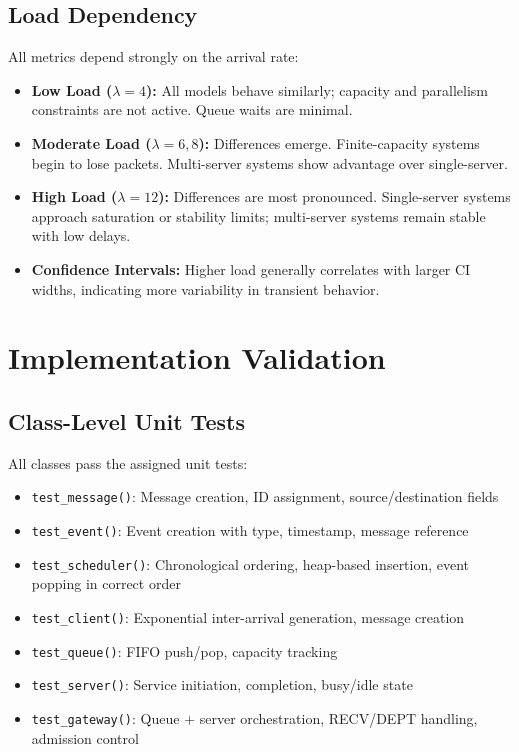 \documentclass[12pt]{article}
\begin{document}
\subsection{Load Dependency}

All metrics depend strongly on the arrival rate:

\begin{itemize}
    \item \textbf{Low Load ($\lambda = 4$):} All models behave similarly; capacity and parallelism constraints are not active. Queue waits are minimal.

    \item \textbf{Moderate Load ($\lambda = 6, 8$):} Differences emerge. Finite-capacity systems begin to lose packets. Multi-server systems show advantage over single-server.

    \item \textbf{High Load ($\lambda = 12$):} Differences are most pronounced. Single-server systems approach saturation or stability limits; multi-server systems remain stable with low delays.

    \item \textbf{Confidence Intervals:} Higher load generally correlates with larger CI widths, indicating more variability in transient behavior.
\end{itemize}

\section{Implementation Validation}

\subsection{Class-Level Unit Tests}

All classes pass the assigned unit tests:

\begin{itemize}
    \item \texttt{test\_message()}: Message creation, ID assignment, source/destination fields
    \item \texttt{test\_event()}: Event creation with type, timestamp, message reference
    \item \texttt{test\_scheduler()}: Chronological ordering, heap-based insertion, event popping in correct order
    \item \texttt{test\_client()}: Exponential inter-arrival generation, message creation
    \item \texttt{test\_queue()}: FIFO push/pop, capacity tracking
    \item \texttt{test\_server()}: Service initiation, completion, busy/idle state
    \item \texttt{test\_gateway()}: Queue + server orchestration, RECV/DEPT handling, admission control
\end{itemize}
\end{document}
